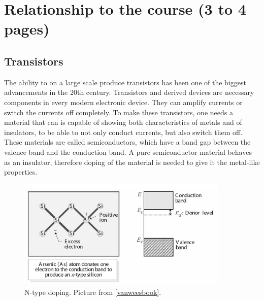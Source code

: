 \section{Relationship to the course (3 to 4 pages)}
% 
% 
% 


\subsection{Transistors}

The ability to on a large scale produce transistors has been one of the biggest advancements in the 20th century. Transistors and derived devices are necessary components in every modern electronic device. They can amplify currents or switch the currents off completely. To make these transistors, one needs a material that can is capable of showing both characteristics of metals and of insulators, to be able to not only conduct currents, but also switch them off. These materials are called semiconductors, which have a band gap between the valence band and the conduction band. A pure semiconductor material behaves as an insulator, therefore doping of the material is needed to give it the metal-like properties.

\begin{figure}[!ht]
 \begin{center}
  \includegraphics[width=0.9\textwidth]{ndoping}
  \caption{N-type doping. Picture from \ref{vanweesbook}.}
  \label{fig:ndoping}
 \end{center}
\end{figure}

